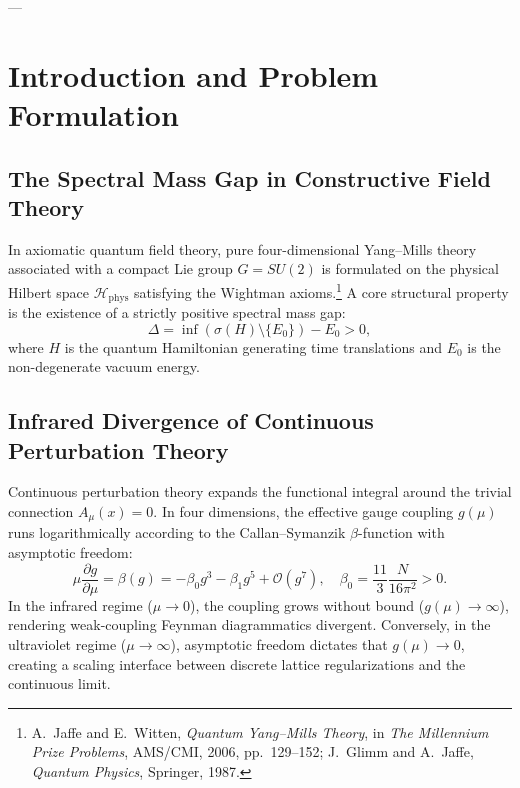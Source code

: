 \documentclass[11pt,reqno]{article}
\begin{document}
---

\section{Introduction and Problem Formulation}
\label{sec:intro}

\subsection{The Spectral Mass Gap in Constructive Field Theory}
In axiomatic quantum field theory, pure four-dimensional Yang--Mills theory associated with a compact Lie group $G = SU(2)$ is formulated on the physical Hilbert space $\mathcal{H}_{\mathrm{phys}}$ satisfying the Wightman axioms.\footnote{A.~Jaffe and E.~Witten, \emph{Quantum Yang--Mills Theory}, in \emph{The Millennium Prize Problems}, AMS/CMI, 2006, pp.~129--152; J.~Glimm and A.~Jaffe, \emph{Quantum Physics}, Springer, 1987.} A core structural property is the existence of a strictly positive spectral mass gap:
\begin{equation}
    \label{eq:mass_gap_def}
    \Delta = \inf \left( \sigma(H) \setminus \{E_0\} \right) - E_0 > 0,
\end{equation}
where $H$ is the quantum Hamiltonian generating time translations and $E_0$ is the non-degenerate vacuum energy.

\subsection{Infrared Divergence of Continuous Perturbation Theory}
Continuous perturbation theory expands the functional integral around the trivial connection $A_\mu(x) = 0$. In four dimensions, the effective gauge coupling $g(\mu)$ runs logarithmically according to the Callan--Symanzik $\beta$-function with asymptotic freedom:
\begin{equation}
    \label{eq:callan_symanzik_1loop}
    \mu \frac{\partial g}{\partial \mu} = \beta(g) = -\beta_0 g^3 - \beta_1 g^5 + \mathcal{O}(g^7), \quad \beta_0 = \frac{11}{3}\frac{N}{16\pi^2} > 0.
\end{equation}
In the infrared regime ($\mu \to 0$), the coupling grows without bound ($g(\mu) \to \infty$), rendering weak-coupling Feynman diagrammatics divergent. Conversely, in the ultraviolet regime ($\mu \to \infty$), asymptotic freedom dictates that $g(\mu) \to 0$, creating a scaling interface between discrete lattice regularizations and the continuous limit.
\end{document}
